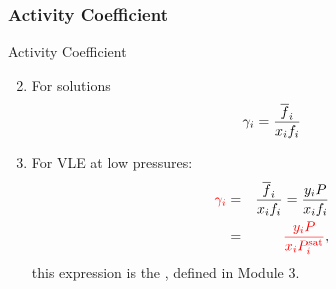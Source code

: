 \documentclass[10pt,compress,unknownkeysallowed]{beamer}
\begin{document}
\begin{frame}
  \frametitle{Activity Coefficient}
       \begin{block}{\begin{center}\normalsize{ Activity Coefficient}\end{center}}
            \begin{enumerate}\setcounter{enumi}{1}  
               \item<1-> For solutions
                  \begin{displaymath}
                     \gamma_{i} = \displaystyle\frac{\overline{f}_{i}}{x_{i}f_{i}}
                  \end{displaymath}
               \item<2-> For VLE at low pressures:
                  \begin{eqnarray}
                      \textcolor{red}{\gamma_{i}} &=& \displaystyle\frac{\overline{f}_{i}}{x_{i}f_{i}} = \displaystyle\frac{y_{i}P}{x_{i}f_{i}} \nonumber \\
                                        &=&  \textcolor{red}{\displaystyle\frac{y_{i}P}{x_{i}P_{i}^{\text{sat}}}}, \nonumber
                  \end{eqnarray}
                  this expression is the , defined in Module 3.
             \end{enumerate}
        \end{block}
         
\end{frame}
\normalsize
\end{document}

